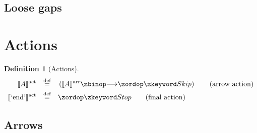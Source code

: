 \documentclass[a4paper,11pt]{report}
\theoremstyle{definition}
\newtheorem{defn}{Definition}
\newcommand{\lquote}[1]{\text{`#1'}}
\newcommand{\defeq}{\mathbin{\overset{\text{def}}=}}
\newcommand{\anarrow}{A}
\begin{document}
\subsection{Loose gaps}

\section{Actions}

\begin{defn}[Actions]

\begin{align*}
	\actsema{\anarrow}
	\quad\defeq\quad&
	\left(
	\arrsema{\anarrow}
	\then
	\Skip
	\right)
	\tag{arrow action}
\\
	\actsema{\lquote{\lstinline|end|}}
	\quad\defeq\quad&
	\Stop
	\tag{final action}
\end{align*}

\end{defn}

\subsection{Arrows}
\end{document}
